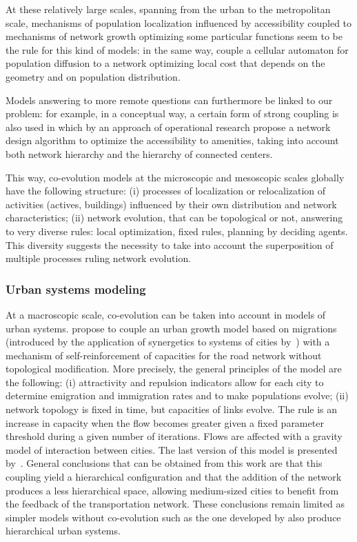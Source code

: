 \documentclass[11pt]{article}
\begin{document}
At these relatively large scales, spanning from the urban to the metropolitan scale, mechanisms of population localization influenced by accessibility coupled to mechanisms of network growth optimizing some particular functions seem to be the rule for this kind of models: in the same way, \cite{wu2017city} couple a cellular automaton for population diffusion to a network optimizing local cost that depends on the geometry and on population distribution.


Models answering to more remote questions can furthermore be linked to our problem: for example, in a conceptual way, a certain form of strong coupling is also used in \citep{bigotte2010integrated} which by an approach of operational research propose a network design algorithm to optimize the accessibility to amenities, taking into account both network hierarchy and the hierarchy of connected centers.


This way, co-evolution models at the microscopic and mesoscopic scales globally have the following structure: (i) processes of localization or relocalization of activities (actives, buildings) influenced by their own distribution and network characteristics; (ii) network evolution, that can be topological or not, answering to very diverse rules: local optimization, fixed rules, planning by deciding agents. This diversity suggests the necessity to take into account the superposition of multiple processes ruling network evolution.


\subsubsection{Urban systems modeling}

At a macroscopic scale, co-evolution can be taken into account in models of urban systems. \cite{baptiste1999interactions} propose to couple an urban growth model based on migrations (introduced by the application of synergetics to systems of cities by~\citep{sanders1992systeme}) with a mechanism of self-reinforcement of capacities for the road network without topological modification. More precisely, the general principles of the model are the following: (i) attractivity and repulsion indicators allow for each city to determine emigration and immigration rates and to make populations evolve; (ii) network topology is fixed in time, but capacities of links evolve. The rule is an increase in capacity when the flow becomes greater given a fixed parameter threshold during a given number of iterations. Flows are affected with a gravity model of interaction between cities. The last version of this model is presented by~\cite{baptistemodeling}. General conclusions that can be obtained from this work are that this coupling yield a hierarchical configuration and that the addition of the network produces a less hierarchical space, allowing medium-sized cities to benefit from the feedback of the transportation network. These conclusions remain limited as simpler models without co-evolution such as the one developed by \cite{raimbault2018indirect} also produce hierarchical urban systems.
\end{document}
